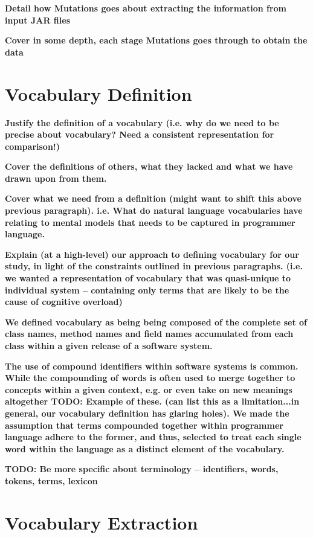 \textbf{Detail how Mutations goes about extracting the information from input JAR files}

\textbf{Cover in some depth, each stage Mutations goes through to obtain the data}


\section{Vocabulary Definition} %
\label{sec:vocabulary_definition}

\textbf{Justify the definition of a vocabulary (i.e. why do we need to be precise about vocabulary? Need a consistent representation for comparison!)}

\textbf{Cover the definitions of others, what they lacked and what we have drawn upon from them.}

\textbf{Cover what we need from a definition (might want to shift this above previous paragraph). i.e. What do natural language vocabularies have relating to mental models that needs to be captured in programmer language.}

\textbf{Explain (at a high-level) our approach to defining vocabulary for our study, in light of the constraints outlined in previous paragraphs. (i.e. we wanted a representation of vocabulary that was quasi-unique to individual system -- containing only terms that are likely to be the cause of cognitive overload)}

\textbf{We defined vocabulary as being being composed of the complete set of class names, method names and field names accumulated from each class within a given release of a software system.}

\textbf{The use of compound identifiers within software systems is common. While the compounding of words is often used to merge together to concepts within a given context, e.g. or even take on new meanings altogether TODO: Example of these. (can list this as a limitation...in general, our vocabulary definition has glaring holes). We made the assumption that terms compounded together within programmer language adhere to the former, and thus, selected to treat each single word within the language as a distinct element of the vocabulary.}

\textbf{TODO: Be more specific about terminology -- identifiers, words, tokens, terms, lexicon}


\section{Vocabulary Extraction} %
\label{sec:vocabulary_extraction}

